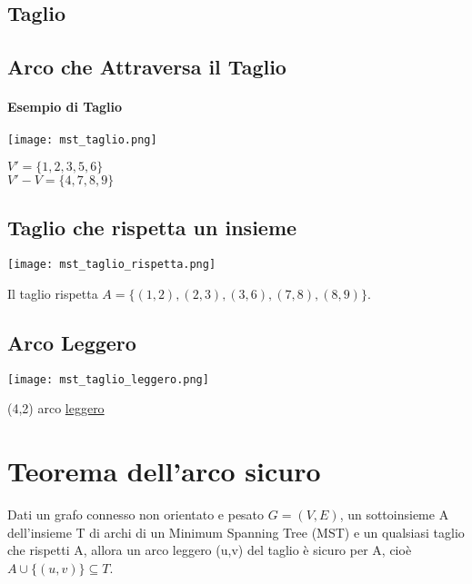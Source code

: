 \subsection{Taglio}
\subsection{Arco che Attraversa il Taglio}
\paragraph*{Esempio di Taglio}
\begin{center}
    \texttt{[image: mst\_taglio.png]}
\end{center}
$V' = \{1,2,3,5,6\}$\\
$V'-V=\{4,7,8,9\}$\\
\subsection{Taglio che rispetta un insieme}
\begin{center}
    \texttt{[image: mst\_taglio\_rispetta.png]}
\end{center}
Il taglio rispetta $A = \{(1,2),(2,3),(3,6),(7,8),(8,9)\}$.
\subsection{Arco Leggero}
\begin{center}
    \texttt{[image: mst\_taglio\_leggero.png]}
\end{center}
(4,2) \ra arco \underline{leggero}
\section{Teorema dell'arco sicuro}
Dati un grafo connesso non orientato e pesato $G=(V,E)$, un sottoinsieme A dell'insieme T di archi di un
Minimum Spanning Tree (MST) e un qualsiasi taglio che rispetti A, allora un arco leggero (u,v) del taglio è
sicuro per A, cioè $A \cup \{(u,v)\} \subseteq T$.

